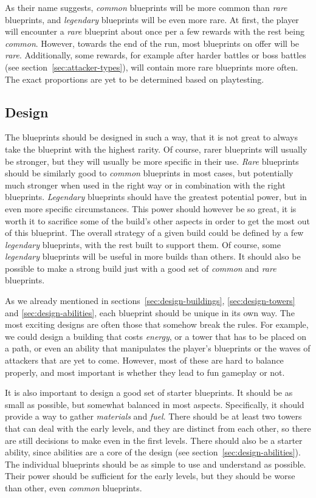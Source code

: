As their name suggests, \emph{common} blueprints will be more common than \emph{rare} blueprints, and \emph{legendary} blueprints will be even more rare.
At first, the player will encounter a \emph{rare} blueprint about once per a few rewards with the rest being \emph{common}.
However, towards the end of the run, most blueprints on offer will be \emph{rare}.
Additionally, some rewards, for example after harder battles or boss battles (see section~\ref{sec:attacker-types}), will contain more rare blueprints more often.
The exact proportions are yet to be determined based on playtesting.

\subsection{Design}

The blueprints should be designed in such a way, that it is not great to always take the blueprint with the highest rarity.
Of course, rarer blueprints will usually be stronger, but they will usually be more specific in their use.
\emph{Rare} blueprints should be similarly good to \emph{common} blueprints in most cases, but potentially much stronger when used in the right way or in combination with the right blueprints.
\emph{Legendary} blueprints should have the greatest potential power, but in even more specific circumstances.
This power should however be so great, it is worth it to sacrifice some of the build's other aspects in order to get the most out of this blueprint.
The overall strategy of a given build could be defined by a few \emph{legendary} blueprints, with the rest built to support them.
Of course, some \emph{legendary} blueprints will be useful in more builds than others.
It should also be possible to make a strong build just with a good set of \emph{common} and \emph{rare} blueprints.

As we already mentioned in sections~\ref{sec:design-buildings}, \ref{sec:design-towers} and \ref{sec:design-abilities}, each blueprint should be unique in its own way.
The most exciting designs are often those that somehow break the rules.
For example, we could design a building that costs \emph{energy}, or a tower that has to be placed on a path, or even an ability that manipulates the player's blueprints or the waves of attackers that are yet to come.
However, most of these are hard to balance properly, and most important is whether they lead to fun gameplay or not.

It is also important to design a good set of starter blueprints.
It should be as small as possible, but somewhat balanced in most aspects.
Specifically, it should provide a way to gather \emph{materials} and \emph{fuel}.
There should be at least two towers that can deal with the early levels, and they are distinct from each other, so there are still decisions to make even in the first levels.
There should also be a starter ability, since abilities are a core of the design (see section~\ref{sec:design-abilities}).
The individual blueprints should be as simple to use and understand as possible.
Their power should be sufficient for the early levels, but they should be worse than other, even \emph{common} blueprints.

